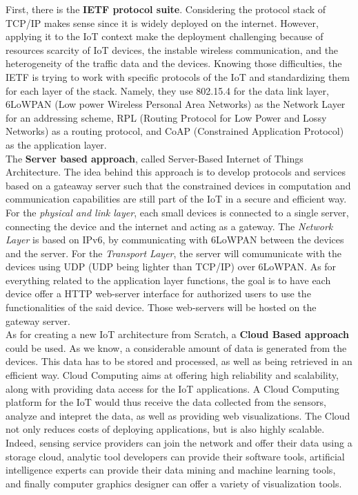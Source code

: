 First, there is the \textbf{IETF protocol suite}. Considering the protocol stack of TCP/IP makes sense since it is widely deployed on the internet. However, applying it to the IoT context make the deployment challenging because of resources scarcity of IoT devices, the instable wireless communication, and the heterogeneity of the traffic data and the devices. Knowing those difficulties, the IETF is trying to work with specific protocols of the IoT and standardizing them  for each layer of the stack. Namely, they use 802.15.4 \cite{molisch2004ieee} for the data link layer, 6LoWPAN \cite{montenegro2007transmission} (Low power Wireless Personal Area Networks) as the Network Layer for an addressing scheme, RPL \cite{winter2012rpl} (Routing Protocol for Low Power and Lossy Networks) as a routing protocol, and CoAP \cite{shelby2014constrained} (Constrained Application Protocol) as the application layer.\\

The \textbf{Server based approach}, called Server-Based Internet of Things Architecture. The idea behind this approach is to develop protocols and services based on a gateaway server such that the constrained devices in computation and communication capabilities are still part of the IoT in a secure and efficient way. For the \textit{physical and link layer}, each small devices is connected to a single server, connecting the device and the internet and acting as a gateway. The \textit{Network Layer} is based on IPv6, by communicating with 6LoWPAN between the devices and the server. For the \textit{Transport Layer}, the server will comumunicate with the devices using UDP (UDP being lighter than TCP/IP) over 6LoWPAN. As for everything related to the application layer functions, the goal is to have each device offer a HTTP web-server interface for authorized users to use the functionalities of the said device. Those web-servers will be hosted on the gateway server.\\

As for creating a new IoT architecture from Scratch, a \textbf{Cloud Based approach} could be used. As we know, a considerable amount of data is generated from the devices. This data has to be stored and processed, as well as being retrieved in an efficient way. Cloud Computing aims at offering high reliability and scalability, along with providing data access for the IoT applications. A Cloud Computing platform for the IoT would thus receive the data collected from the sensors, analyze and intepret the data, as well as providing web visualizations. The Cloud not only reduces costs of deploying applications, but is also highly scalable. Indeed, sensing service providers can join the network and offer their data using a storage cloud, analytic tool developers can provide their software tools, artificial intelligence experts can provide their data mining and machine learning tools, and finally computer graphics designer can offer a variety of visualization tools.



